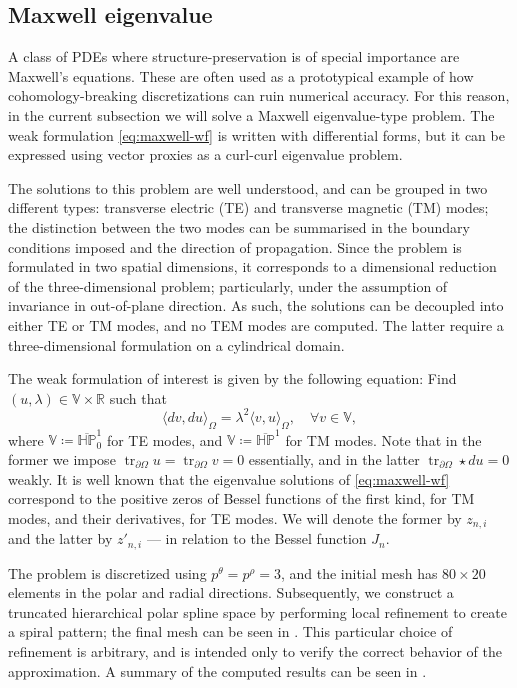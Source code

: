 \documentclass[10pt]{article}
\newcommand{\RR}{{\mathbb{R}}}
\DeclareMathOperator{\trace}{tr}
\newcommand{\vSpace}[1]{\mathbb{#1}}
\newcommand{\polar}{P}
\newcommand{\hSpace}[1]{\mathit{\vSpace{H}\vSpace{#1}}}
\theoremstyle{plain}
\theoremstyle{definition}
\theoremstyle{remark}
\begin{document}
\subsection{Maxwell eigenvalue}
\label{subsec:maxwell}

A class of PDEs where structure-preservation is of special importance are Maxwell's
equations.
These are often used as a prototypical example of how cohomology-breaking discretizations
can ruin numerical accuracy.
For this reason, in the current subsection we will solve a Maxwell eigenvalue-type problem.
The weak formulation \eqref{eq:maxwell-wf} is written with differential forms, but it can be
expressed using vector proxies as a curl-curl eigenvalue problem.

The solutions to this problem are well understood, and can be grouped in two different
types: transverse electric (TE) and transverse magnetic (TM) modes; the distinction between
the two modes can be summarised in the boundary conditions imposed and the direction of
propagation. 
Since the problem is formulated in two spatial dimensions, it corresponds to a dimensional
reduction of the three-dimensional problem; particularly, under the assumption of invariance
in out-of-plane direction.
As such, the solutions can be decoupled into either TE or TM modes, and no TEM modes are
computed. The latter require a three-dimensional formulation on a cylindrical domain.

The weak formulation of interest is given by the following equation:
Find \((u, \lambda) \in \vSpace{V} \times \RR\) such that 
\begin{equation}
    \label{eq:maxwell-wf}
    \langle dv, du \rangle_{\Omega} = \lambda^2 \langle v, u \rangle_{\Omega},\quad \forall
    v \in \vSpace{V},
\end{equation}
where \(\vSpace{V} \coloneqq  \overline{\hSpace{\polar}}^{1}_0\) for TE modes, and  \(\vSpace{V}
\coloneqq  \overline{\hSpace{\polar}}^{1}\) for TM modes.
Note that in the former we impose \(\trace_{\partial \Omega} u = \trace_{\partial \Omega} v=
0\) essentially, and in the latter \(\trace_{\partial \Omega} \star du = 0\) weakly. It is
well known that the eigenvalue solutions of \eqref{eq:maxwell-wf} correspond to the positive
zeros of Bessel functions of the first kind, for TM modes, and their derivatives, for TE
modes. 
We will denote the former by \(z_{n,i}\) and the latter by \(z'_{n,i}\) --- in relation to
the Bessel function \(J_n\).

The problem is discretized using \(p^\theta = p^\rho = 3\), and the initial mesh has
\(80\times20\) elements in the polar and radial directions. Subsequently, we construct a
truncated hierarchical polar spline space by performing local refinement to create a spiral
pattern; the final mesh can be seen in . 
This particular choice of refinement is arbitrary, and is intended only to verify the
correct behavior of the approximation.
A summary of the computed results can be seen in . 
\end{document}
